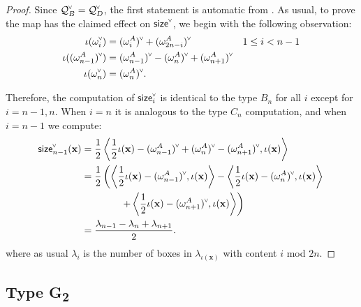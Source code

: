 \documentclass[ALCO,published]{cedram}
\newcommand{\chk}[1]{#1^{\normalfont\smash{\scalebox{.5}[.5]{\rotatebox{90}{\textbf{\textless}}}}}}
\newcommand{\Q}{\mathcal{Q}}
\newcommand{\size}{{\sf size}}
\begin{document}
\begin{proof}
Since $\chk{\Q}_B=\chk{\Q}_D$, the first statement is automatic from . As usual, to prove the map has the claimed effect on $\chk{\size}$, we begin with the following observation:
\begin{align*}
\iota(\chk{\omega_i}) &= \chk{(\omega_i^A)}+\chk{(\omega_{2n-i}^A)} & 1\leq i<n-1\\
\iota(\chk{(\omega_{n-1}^A)}) &= \chk{(\omega_{n-1}^A)}-\chk{(\omega_n^A)}+\chk{(\omega_{n+1}^A)} \\
\iota(\chk{\omega_n}) &= \chk{(\omega_n^A)}.
\end{align*}

 Therefore, the computation of $\chk{\size}_i$ is identical to the type $B_n$ for all $i$ except for $i=n-1,n$. When $i=n$ it is analogous to the type $C_n$ computation, and when $i=n-1$ we compute:
\begin{align*}
\chk{\size}_{n-1}(\mathbf{x}) 
&= \frac{1}{2}\left\langle \frac{1}{2}\iota(\mathbf{x}) - \chk{(\omega_{n-1}^A)}+\chk{(\omega_{n}^A)}- \chk{(\omega_{n+1}^A)}, \iota(\mathbf{x}) \right\rangle \\
&= \frac{1}{2}\left(\left\langle \frac{1}{2}\iota(\mathbf{x}) - \chk{(\omega_{n-1}^A)}, \iota(\mathbf{x}) \right\rangle - \left\langle \frac{1}{2}\iota(\mathbf{x}) - \chk{(\omega_{n}^A)}, \iota(\mathbf{x}) \right\rangle \right. \\
& \qquad\qquad \left. + \left\langle \frac{1}{2}\iota(\mathbf{x}) - \chk{(\omega_{n+1}^A)}, \iota(\mathbf{x}) \right\rangle \right) \\
&= \frac{\lambda_{n-1} - \lambda_{n} + \lambda_{n+1}}{2}.
\end{align*}
where as usual $\lambda_i$ is the number of boxes in $\lambda_{\iota(\mathbf{x})}$ with content $i$ mod $2n$.
\end{proof}


\subsection{Type G\texorpdfstring{\textsubscript{2}}{2}}
\label{sec:modelG}
\end{document}
